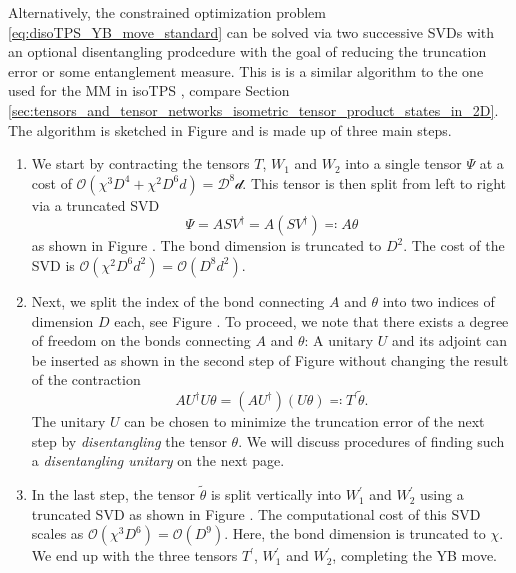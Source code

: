 Alternatively, the constrained optimization problem \eqref{eq:disoTPS_YB_move_standard} can be solved via two successive SVDs with an optional disentangling prodcedure with the goal of reducing the truncation error or some entanglement measure. This is is a similar algorithm to the one used for the MM in isoTPS \cite{cite:efficient_simulation_of_dynamics_in_two_dimensional_quantum_spin_systems}, compare Section \ref{sec:tensors_and_tensor_networks_isometric_tensor_product_states_in_2D}. The algorithm is sketched in Figure  and is made up of three main steps.
\begin{enumerate}
	\item We start by contracting the tensors $T$, $W_1$ and $W_2$ into a single tensor $\Psi$ at a cost of $\mathcal{O}(\chi^3D^4+\chi^2D^6d) = \mathcal{D^8d}$. This tensor is then split from left to right via a truncated SVD
	\begin{equation}
		\Psi = ASV^\dagger = A\left(SV^\dagger\right) \eqqcolon A\theta
	\end{equation}
	as shown in Figure . The bond dimension is truncated to $D^2$. The cost of the SVD is $\mathcal{O}(\chi^2D^6d^2) = \mathcal{O}(D^8d^2)$.
	\item Next, we split the index of the bond connecting $A$ and $\theta$ into two indices of dimension $D$ each, see Figure . To proceed, we note that there exists a degree of freedom on the bonds connecting $A$ and $\theta$: A unitary $U$ and its adjoint can be inserted as shown in the second step of Figure  without changing the result of the contraction
	\begin{equation}
		AU^\dagger U\theta = \left(AU^\dagger\right)\left(U\theta\right) \eqqcolon T^\prime \tilde{\theta}.
	\end{equation}
	The unitary $U$ can be chosen to minimize the truncation error of the next step by \textit{disentangling} the tensor $\theta$. We will discuss procedures of finding such a \textit{disentangling unitary} on the next page.
	\item In the last step, the tensor $\tilde{\theta}$ is split vertically into $W_1^\prime$ and $W_2^\prime$ using a truncated SVD as shown in Figure . The computational cost of this SVD scales as $\mathcal{O}(\chi^3D^6) = \mathcal{O}(D^9)$. Here, the bond dimension is truncated to $\chi$. We end up with the three tensors $T^\prime$, $W_1^\prime$ and $W_2^\prime$, completing the YB move.
\end{enumerate}
